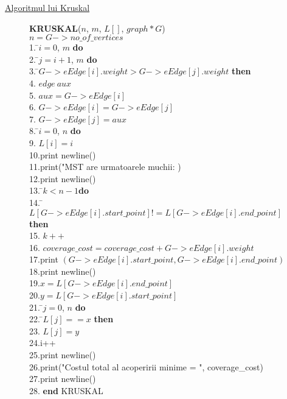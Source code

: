 \documentclass[14pt]{article}
\begin{document}
\vspace{20mm}

\newpage

\large{\underline{Algoritmul lui Kruskal}}

\vspace{10mm}
\begin{figure}[h]
\begin{center}
\begin{tabbing}
\textbf{KRUSKAL}($n$, $m$, $L[]$, $graph *G$)\\
$n = G -> no\_of\_vertices$\\
1.  \=$i = 0$, $m$ {\bf do} \\
2.        \=$j = i + 1$, $m$ {\bf do} \\
3.\indent            {} \=$G -> eEdge[ i ].weight  >  G -> eEdge[ j].weight$ {\bf then} \\
4. \indent                \>         \> $edge\ aux$ \\
5. \indent                \>         \> $aux = G -> eEdge[ i ]$ \\
6. \indent                \>         \> $G -> eEdge[ i ] = G -> eEdge[ j ]$ \\
7. \indent                \>         \> $G -> eEdge[ j ] = aux$ \\
8.  \=$i = 0$, $n$ {\bf do} \\
9. \indent            \> $L[i] = i$ \\
10.\indent  print newline()\\
11.\indent  print("MST are urmatoarele muchii: )\\
12.\indent  print newline()\\
13. \indent     {} \=$k < n - 1${\bf do} \\
14.\indent          {}    \=$L[G -> eEdge[ i ].start\_point]  !=  L[G -> eEdge[ i ].end\_point]$ {\bf then}\\
15. \indent                      \>     \> $k++$ \\
16. \indent                      \>     \> $coverage\_cost  =  coverage\_cost  +  G -> eEdge[ i ].weight$ \\
17.\indent  print $(G -> eEdge[ i ].start\_point,  G -> eEdge[ i ].end\_point )$\\
18.\indent  print newline()\\
19.$x = L [G -> eEdge[ i ].end\_point]$\\	
20.$y = L [G -> eEdge[ i ].start\_point]$\\
21.  \=$j = 0$, $n$ {\bf do} \\
22.\indent            {} \=$L[ j ] == x$ {\bf then} \\
23. \indent           \>           \> $L[ j ] = y$ \\
24.i++\\
25.\indent print newline()\\
26.\indent print("Costul total al acoperirii minime  =   ", coverage\_cost)\\
27.\indent  print newline()\\
28.  \textbf{end} KRUSKAL


\end{tabbing}
\end{center}
\end{figure}
\end{document}
